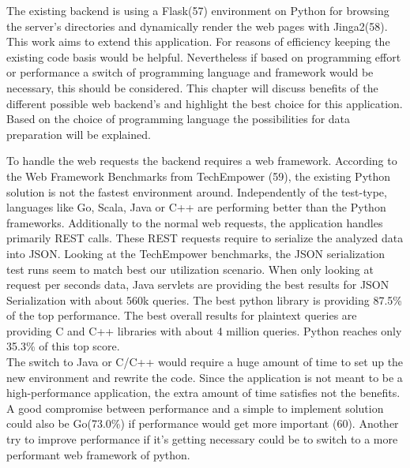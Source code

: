\documentclass[american,a4paper,oneside,,tablecaptionabove]{scrbook}
\begin{document}
The existing backend is using a Flask(57) environment on Python for
browsing the server's directories and dynamically render the web pages
with Jinga2(58). This work aims to extend this application. For reasons
of efficiency keeping the existing code basis would be helpful.
Nevertheless if based on programming effort or performance a switch of
programming language and framework would be necessary, this should be
considered. This chapter will discuss benefits of the different possible
web backend's and highlight the best choice for this application. Based
on the choice of programming language the possibilities for data
preparation will be explained.

To handle the web requests the backend requires a web framework.
According to the Web Framework Benchmarks from TechEmpower (59), the
existing Python solution is not the fastest environment around.
Independently of the test-type, languages like Go, Scala, Java or C++
are performing better than the Python frameworks. Additionally to the
normal web requests, the application handles primarily REST calls. These
REST requests require to serialize the analyzed data into JSON. Looking
at the TechEmpower benchmarks, the JSON serialization test runs seem to
match best our utilization scenario. When only looking at request per
seconds data, Java servlets are providing the best results for JSON
Serialization with about 560k queries. The best python library is
providing 87.5\% of the top performance. The best overall results for
plaintext queries are providing C and C++ libraries with about 4 million
queries. Python reaches only 35.3\% of this top score.\\
The switch to Java or C/C++ would require a huge amount of time to set
up the new environment and rewrite the code. Since the application is
not meant to be a high-performance application, the extra amount of time
satisfies not the benefits. A good compromise between performance and a
simple to implement solution could also be Go(73.0\%) if performance
would get more important (60). Another try to improve performance if
it's getting necessary could be to switch to a more performant web
framework of python.
\end{document}

